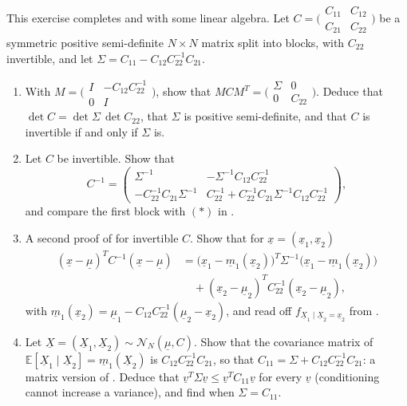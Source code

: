 \begin{exercise}\label{ex:gc-schur}
\hard This exercise completes  and  with some linear
algebra. Let $C=\big(\begin{smallmatrix}C_{11}&C_{12}\\C_{21}&C_{22}\end{smallmatrix}\big)$ be a
symmetric positive semi-definite $N\times N$ matrix split into blocks, with $C_{22}$ invertible, and
let $\Sigma=C_{11}-C_{12}C_{22}^{-1}C_{21}$.
\begin{enumerate}[label=(\alph*)]
  \item With $M=\big(\begin{smallmatrix}I&-C_{12}C_{22}^{-1}\\0&I\end{smallmatrix}\big)$, show that
    $MCM^T=\big(\begin{smallmatrix}\Sigma&0\\0&C_{22}\end{smallmatrix}\big)$. Deduce that
    $\det C=\det\Sigma\,\det C_{22}$, that $\Sigma$ is positive semi-definite, and that $C$ is
    invertible if and only if $\Sigma$ is.
  \item Let $C$ be invertible. Show that
    \[
      C^{-1}=\begin{pmatrix}\Sigma^{-1}&-\Sigma^{-1}C_{12}C_{22}^{-1}\\
      -C_{22}^{-1}C_{21}\Sigma^{-1}&C_{22}^{-1}+C_{22}^{-1}C_{21}\Sigma^{-1}C_{12}C_{22}^{-1}\end{pmatrix},
    \]
    and compare the first block with $(*)$ in .
  \item A second proof of  for invertible $C$. Show that for $\underline x=(\underline x_1,\underline x_2)$
    \[
      \begin{aligned}
      (\underline x-\underline\mu)^TC^{-1}(\underline x-\underline\mu)
      &=\big(\underline x_1-\underline m_1(\underline x_2)\big)^T\Sigma^{-1}\big(\underline x_1-\underline m_1(\underline x_2)\big)\\
      &\quad+(\underline x_2-\underline\mu_2)^TC_{22}^{-1}(\underline x_2-\underline\mu_2),
      \end{aligned}
    \]
    with $\underline m_1(\underline x_2)=\underline\mu_1-C_{12}C_{22}^{-1}(\underline\mu_2-\underline x_2)$, and read off $f_{\underline X_1\mid\underline X_2=\underline x_2}$ from
    .
  \item Let $\underline X=(\underline X_1,\underline X_2)\sim\mathcal N_N(\underline\mu,C)$. Show that the covariance matrix of
    $\mathbb E[\underline X_1\mid\underline X_2]=\underline m_1(\underline X_2)$ is $C_{12}C_{22}^{-1}C_{21}$, so that
    $C_{11}=\Sigma+C_{12}C_{22}^{-1}C_{21}$: a matrix version of .
    Deduce that $\underline v^T\Sigma\underline v\le\underline v^TC_{11}\underline v$ for every $\underline v$ (conditioning cannot increase a variance), and
    find when $\Sigma=C_{11}$.
\end{enumerate}
\end{exercise}

